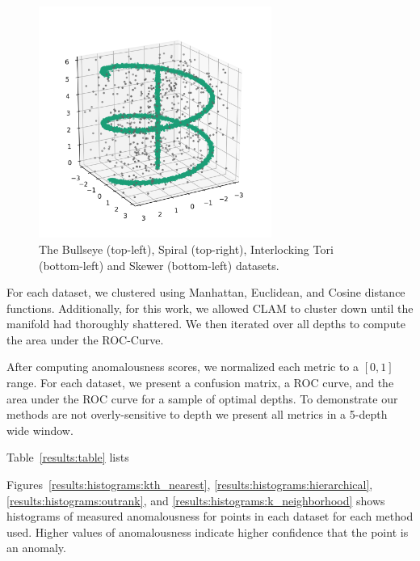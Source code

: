 \begin{figure}[!t]
\includegraphics[width=3in]{static/skewer.png}
\caption{The Bullseye (top-left), Spiral (top-right), Interlocking Tori (bottom-left) and Skewer (bottom-left) datasets.}
\label{results:datasets}
\end{figure}

For each dataset, we clustered using Manhattan, Euclidean, and Cosine distance functions.
Additionally, for this work, we allowed CLAM to cluster down until the manifold had thoroughly shattered.
We then iterated over all depths to compute the area under the ROC-Curve.

After computing anomalousness scores, we normalized each metric to a $[0, 1]$ range.
For each dataset, we present a confusion matrix, a ROC curve, and the area under the ROC curve for a sample of optimal depths. 
To demonstrate our methods are not overly-sensitive to depth we present all metrics in a 5-depth wide window.

Table~\ref{results:table} lists %

Figures~\ref{results:histograms:kth_nearest}, \ref{results:histograms:hierarchical}, \ref{results:histograms:outrank}, and \ref{results:histograms:k_neighborhood} shows histograms of measured anomalousness for points in each dataset for each method used.
Higher values of anomalousness indicate higher confidence that the point is an anomaly.

